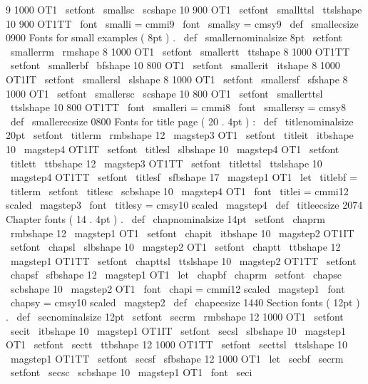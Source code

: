 {{{{
9
}
{
1000
}
{
OT1
}
\
setfont
\
smallsc
\
scshape
{
10
}
{
900
}
{
OT1
}
\
setfont
\
smallttsl
\
ttslshape
{
10
}
{
900
}
{
OT1TT
}
\
font
\
smalli
=
cmmi9
\
font
\
smallsy
=
cmsy9
\
def
\
smallecsize
{
0900
}
%
Fonts
for
small
examples
(
8pt
)
.
\
def
\
smallernominalsize
{
8pt
}
\
setfont
\
smallerrm
\
rmshape
{
8
}
{
1000
}
{
OT1
}
\
setfont
\
smallertt
\
ttshape
{
8
}
{
1000
}
{
OT1TT
}
\
setfont
\
smallerbf
\
bfshape
{
10
}
{
800
}
{
OT1
}
\
setfont
\
smallerit
\
itshape
{
8
}
{
1000
}
{
OT1IT
}
\
setfont
\
smallersl
\
slshape
{
8
}
{
1000
}
{
OT1
}
\
setfont
\
smallersf
\
sfshape
{
8
}
{
1000
}
{
OT1
}
\
setfont
\
smallersc
\
scshape
{
10
}
{
800
}
{
OT1
}
\
setfont
\
smallerttsl
\
ttslshape
{
10
}
{
800
}
{
OT1TT
}
\
font
\
smalleri
=
cmmi8
\
font
\
smallersy
=
cmsy8
\
def
\
smallerecsize
{
0800
}
%
Fonts
for
title
page
(
20
.
4pt
)
:
\
def
\
titlenominalsize
{
20pt
}
\
setfont
\
titlerm
\
rmbshape
{
12
}
{
\
magstep3
}
{
OT1
}
\
setfont
\
titleit
\
itbshape
{
10
}
{
\
magstep4
}
{
OT1IT
}
\
setfont
\
titlesl
\
slbshape
{
10
}
{
\
magstep4
}
{
OT1
}
\
setfont
\
titlett
\
ttbshape
{
12
}
{
\
magstep3
}
{
OT1TT
}
\
setfont
\
titlettsl
\
ttslshape
{
10
}
{
\
magstep4
}
{
OT1TT
}
\
setfont
\
titlesf
\
sfbshape
{
17
}
{
\
magstep1
}
{
OT1
}
\
let
\
titlebf
=
\
titlerm
\
setfont
\
titlesc
\
scbshape
{
10
}
{
\
magstep4
}
{
OT1
}
\
font
\
titlei
=
cmmi12
scaled
\
magstep3
\
font
\
titlesy
=
cmsy10
scaled
\
magstep4
\
def
\
titleecsize
{
2074
}
%
Chapter
fonts
(
14
.
4pt
)
.
\
def
\
chapnominalsize
{
14pt
}
\
setfont
\
chaprm
\
rmbshape
{
12
}
{
\
magstep1
}
{
OT1
}
\
setfont
\
chapit
\
itbshape
{
10
}
{
\
magstep2
}
{
OT1IT
}
\
setfont
\
chapsl
\
slbshape
{
10
}
{
\
magstep2
}
{
OT1
}
\
setfont
\
chaptt
\
ttbshape
{
12
}
{
\
magstep1
}
{
OT1TT
}
\
setfont
\
chapttsl
\
ttslshape
{
10
}
{
\
magstep2
}
{
OT1TT
}
\
setfont
\
chapsf
\
sfbshape
{
12
}
{
\
magstep1
}
{
OT1
}
\
let
\
chapbf
\
chaprm
\
setfont
\
chapsc
\
scbshape
{
10
}
{
\
magstep2
}
{
OT1
}
\
font
\
chapi
=
cmmi12
scaled
\
magstep1
\
font
\
chapsy
=
cmsy10
scaled
\
magstep2
\
def
\
chapecsize
{
1440
}
%
Section
fonts
(
12pt
)
.
\
def
\
secnominalsize
{
12pt
}
\
setfont
\
secrm
\
rmbshape
{
12
}
{
1000
}
{
OT1
}
\
setfont
\
secit
\
itbshape
{
10
}
{
\
magstep1
}
{
OT1IT
}
\
setfont
\
secsl
\
slbshape
{
10
}
{
\
magstep1
}
{
OT1
}
\
setfont
\
sectt
\
ttbshape
{
12
}
{
1000
}
{
OT1TT
}
\
setfont
\
secttsl
\
ttslshape
{
10
}
{
\
magstep1
}
{
OT1TT
}
\
setfont
\
secsf
\
sfbshape
{
12
}
{
1000
}
{
OT1
}
\
let
\
secbf
\
secrm
\
setfont
\
secsc
\
scbshape
{
10
}
{
\
magstep1
}
{
OT1
}
\
font
\
seci
}}}
